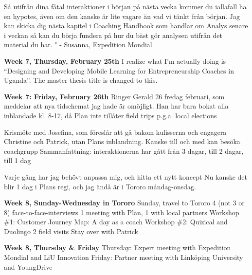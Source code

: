 Så utifrån dina fåtal interaktioner i början på nästa vecka kommer du iallafall ha en hypotes, även om den kanske är lite vagare än vad vi tänkt från början. Jag kan skicka dig nästa kapitel i Coaching Handbook som handlar om Analys senare i veckan så kan du börja fundera på hur du bäst gör analysen utifrån det material du har. " - Susanna, Expedition Mondial

\textbf{Week 7, Thursday, February 25th}
I realize what I’m actually doing is “Designing and Developing Mobile Learning for Entrepreneurship Coaches in Uganda”. The master thesis title is changed to this.

\textbf{Week 7: Friday, February 26th}
Ringer Gerald 26 fredag februari, som meddelar att nya tidschemat jag hade är omöjligt. Han har bara bokat alla inblandade kl. 8-17, då Plan inte tillåter field trips p.g.a. local elections

Krismöte med Josefina, som föreslår att gå bakom kulisserna och engagera Christine och Patrick, utan Plans inblandning. Kanske till och med kan besöka coachgrupp
Sammanfattning: interaktionerna har gått från 3 dagar, till 2 dagar, till 1 dag

Varje gång har jag behövt anpassa mig, och hitta ett nytt koncept
Nu kanske det blir 1 dag i Plans regi, och jag ändå är i Tororo måndag-onsdag.

\textbf{Week 8, Sunday-Wednesday in Tororo}
Sunday, travel to Tororo
4 (not 3 or 8) face-to-face-interviews
1 meeting with Plan, 1 with local partners
Workshop \#1: Customer Journey Map: A day as a coach
Workshop \#2: Quizical and Duolingo
2 field visits
Stay over with Patrick

\textbf{Week 8, Thursday \& Friday}
Thursday: Expert meeting with Expedition Mondial and LiU Innovation
Friday: Partner meeting with Linköping University and YoungDrive
